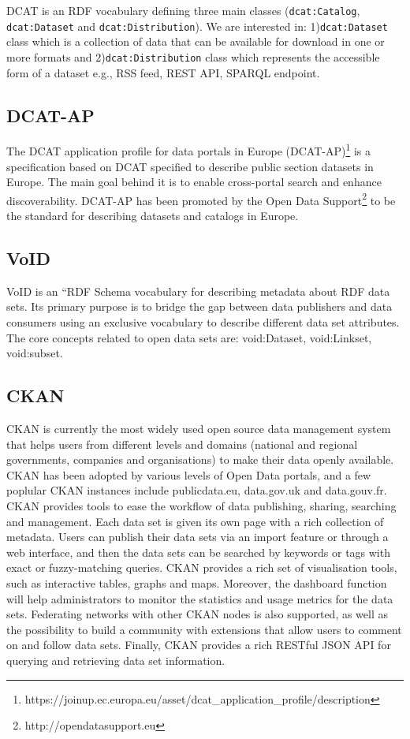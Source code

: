 \documentclass[runningheads,a4paper]{llncs}
\begin{document}
DCAT is an RDF vocabulary defining three main classes (\texttt{dcat:Catalog}, \texttt{dcat:Dataset} and \texttt{dcat:Distribution}). We are interested in: 1)\texttt{dcat:Dataset} class which is a collection of data that can be available for download in one or more formats and 2)\texttt{dcat:Distribution} class which represents the accessible form of a dataset e.g., RSS feed, REST API, SPARQL endpoint.

\subsection{DCAT-AP}

The DCAT application profile for data portals in Europe (DCAT-AP)\footnote{https://joinup.ec.europa.eu/asset/dcat\_application\_profile/description} is a specification based on DCAT specified to describe public section datasets in Europe. The main goal behind it is to enable cross-portal search and enhance discoverability. DCAT-AP has been promoted by the Open Data Support\footnote{http://opendatasupport.eu} to be the standard for describing datasets and catalogs in Europe.

\subsection{VoID}

VoID is an “RDF Schema vocabulary for describing metadata about RDF data sets. Its primary purpose is to bridge the gap between data publishers and data consumers using an exclusive vocabulary to describe different data set attributes. The core concepts related to open data sets are: void:Dataset, void:Linkset, void:subset.

\subsection{CKAN}

CKAN is currently the most widely used open source data management system that helps users from different levels and domains (national and regional governments, companies and organisations) to make their data openly available. CKAN has been adopted by various levels of Open Data portals, and a few poplular CKAN instances include publicdata.eu, data.gov.uk and data.gouv.fr. CKAN provides tools to ease the workflow of data publishing, sharing, searching and management. Each data set is given its own page with a rich collection of metadata. Users can publish their data sets via an import feature or through a web interface, and then the data sets can be searched by keywords or tags with exact or fuzzy-matching queries. CKAN provides a rich set of visualisation tools, such as interactive tables, graphs and maps. Moreover, the dashboard function will help administrators to monitor the statistics and usage metrics for the data sets. Federating networks with other CKAN nodes is also supported, as well as the possibility to build a community with extensions that allow users to comment on and follow data sets. Finally, CKAN provides a rich RESTful JSON API for querying and retrieving data set information.
\end{document}

